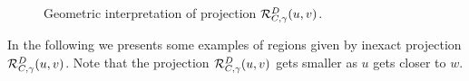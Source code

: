 \begin{figure}[H]
	\begin{subfigmatrix}{2}
	\end{subfigmatrix}
	\caption{Geometric interpretation of projection ${\cal R}_{C,\gamma}^{D}(u, v)$.}
	\label{fig:condProj1}
\end{figure}
In the following we presents some examples of regions given by inexact projection ${\cal R}_{C,\gamma}^{D}(u, v)$. Note that the projection ${\cal R}_{C,\gamma}^{D}(u, v)$ gets smaller as $u$ gets closer to $w$.
